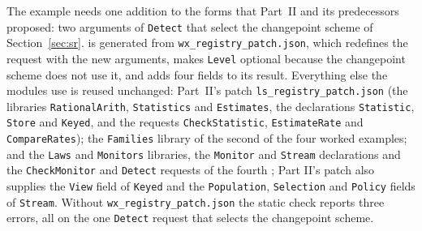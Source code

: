 \documentclass[11pt]{article}
\newcommand{\fpath}[1]{\nolinkurl{#1}}
\newcommand{\code}[1]{\texttt{#1}}
\theoremstyle{definition}
\theoremstyle{plain}
\begin{document}
The example needs one addition to the forms that Part~II and its predecessors proposed: two
arguments of \code{Detect} that select the changepoint scheme of Section~\ref{sec:sr}.
 is generated from \fpath{wx_registry_patch.json}, which redefines the request with
the new arguments, makes \code{Level} optional because the changepoint scheme does not use it, and
adds four fields to its result. Everything else the modules use is reused unchanged: Part~II's
patch \fpath{ls_registry_patch.json} (the libraries \code{RationalArith}, \code{Statistics} and
\code{Estimates}, the declarations \code{Statistic}, \code{Store} and \code{Keyed}, and the requests
\code{CheckStatistic}, \code{EstimateRate} and \code{CompareRates}); the \code{Families} library of
the second of the four worked examples; and the \code{Laws} and \code{Monitors} libraries, the
\code{Monitor} and \code{Stream} declarations and the \code{CheckMonitor} and \code{Detect} requests
of the fourth \cite[Appendix~B]{worked}; Part II's patch also supplies the \code{View} field of
\code{Keyed} and the \code{Population}, \code{Selection} and \code{Policy} fields of \code{Stream}.
Without \fpath{wx_registry_patch.json} the static check reports three errors, all on the
one \code{Detect} request that selects the changepoint scheme.
\end{document}
